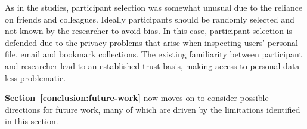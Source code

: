 As in the studies, participant selection was somewhat unusual due to the reliance on friends and colleagues. Ideally participants should be randomly selected and not known by the researcher to avoid bias.  In this case, participant selection is defended due to the privacy problems that arise when inspecting users' personal file, email and bookmark collections.  The existing familiarity between participant and researcher lead to an established trust basis, making access to personal data less problematic.  %

\textbf{Section~\ref{conclusion:future-work}} now moves on to consider possible directions for future work, many of which are driven by the limitations identified in this section.












